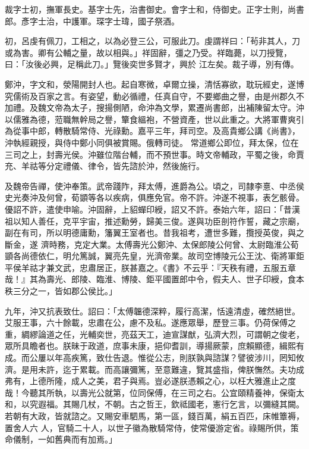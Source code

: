 \begin{pinyinscope}
 裁字士初，撫軍長史。基字士先，治書御史。會字士和，侍御史。正字士則，尚書郎。彥字士治，中護軍。琛字士瑋，國子祭酒。



 初，呂虔有佩刀，工相之，以為必登三公，可服此刀。虔謂祥曰：「茍非其人，刀或為害。卿有公輔之量，故以相與。」祥固辭，彊之乃受。祥臨薨，以刀授覽，曰：「汝後必興，足稱此刀。」覽後奕世多賢才，興於
 江左矣。裁子導，別有傳。



 鄭沖，字文和，滎陽開封人也。起自寒微，卓爾立操，清恬寡欲，耽玩經史，遂博究儒術及百家之言。有姿望，動必循禮，任真自守，不要鄉曲之譽，由是州郡久不加禮。及魏文帝為太子，搜揚側陋，命沖為文學，累遷尚書郎，出補陳留太守。沖以儒雅為德，蒞職無幹局之譽，簞食縕袍，不營資產，世以此重之。大將軍曹爽引為從事中郎，轉散騎常侍、光祿勳。嘉平三年，拜司空。及高貴鄉公講《尚書》，沖執經親授，與侍中鄭小同俱被賞賜。俄轉司徒。
 常道鄉公即位，拜太保，位在三司之上，封壽光侯。沖雖位階台輔，而不預世事。時文帝輔政，平蜀之後，命賈充、羊祜等分定禮儀、律令，皆先諮於沖，然後施行。



 及魏帝告禪，使沖奉策。武帝踐阼，拜太傅，進爵為公。頃之，司隸李憙、中丞侯史光奏沖及何曾，荀顗等各以疾病，俱應免官。帝不許。沖遂不視事，表乞骸骨。優詔不許，遣使申喻。沖固辭，上貂蟬印綬，詔又不許。泰始六年，詔曰：「昔漢祖以知人善任，克平宇宙，推述勳勞，歸美三俊。遂與功臣剖符作誓，藏之宗廟，副在有司，所以明德庸勳，籓翼王室者也。昔我祖考，遭世多難，攬授英俊，與之斷金，遂
 濟時務，克定大業。太傅壽光公鄭沖、太保郎陵公何曾、太尉臨淮公荀顗各尚德依仁，明允篤誠，翼亮先皇，光濟帝業。故司空博陵元公王沈、衛將軍鉅平侯羊祜才兼文武，忠肅居正，朕甚嘉之。《書》不云乎：『天秩有禮，五服五章哉！』其為壽光、郎陵、臨淮、博陵、鉅平國置郎中令，假夫人、世子印綬，食本秩三分之一，皆如郡公侯比。」



 九年，沖又抗表致仕。詔曰：「太傅韞德深粹，履行高潔，恬遠清虛，確然絕世。艾服王事，六十餘載，忠肅在公，慮不及私。遂應眾舉，歷登三事。仍荷保傅之重，綢繆論道之任，光輔奕世，亮茲天工，迪宣謀猷，弘濟大烈，可謂朝之俊老，
 眾所具瞻者也。朕昧于政道，庶事未康，挹仰耆訓，導揚厥蒙，庶賴顯德，緝熙有成。而公屢以年高疾篤，致仕告退。惟從公志，則朕孰與諮謀？譬彼涉川，罔知攸濟。是用未許，迄于累載。而高讓彌篤，至意難違，覽其盛指，俾朕憮然。夫功成弗有，上德所隆，成人之美，君子與焉。豈必遂朕憑賴之心，以枉大雅進止之度哉！今聽其所執，以壽光公就第，位同保傅，在三司之右。公宜頤精養神，保衛太和，以究遐福。其賜几杖，不朝。古之哲王，欽祗國老，憲行乞言，以彌縫其闕。若朝有大政，皆就諮之。又賜安車駟馬，第一區，錢百萬，絹五百匹，床帷簟褥，置舍人六
 人，官騎二十人，以世子徽為散騎常侍，使常優游定省。祿賜所供，策命儀制，一如舊典而有加焉。」




\end{pinyinscope}
